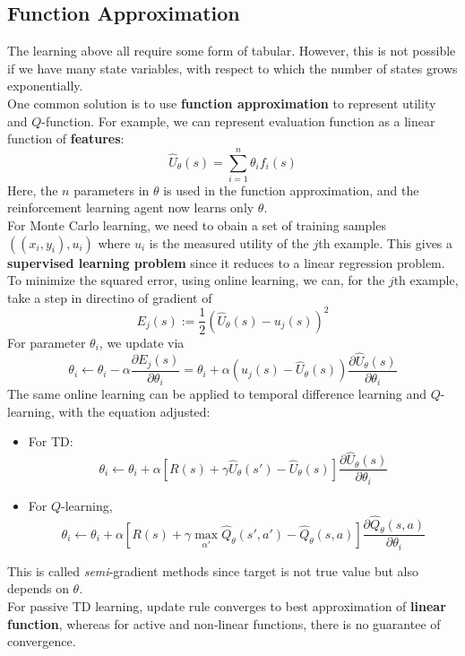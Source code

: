 \documentclass[12pt]{article}
\theoremstyle{definition}
\begin{document}
\subsection{Function Approximation}
The learning above all require some form of tabular. However, this is not possible if we have many state variables, with respect to which the number of states grows exponentially. \\
One common solution is to use \textbf{function approximation} to represent utility and $Q$-function. For example, we can represent evaluation function as a linear function of \textbf{features}:
\[
\hat{U}_{\theta}(s)=\sum_{i=1}^n \theta_if_i(s)
\]
Here, the $n$ parameters in $\theta$ is used in the function approximation, and the reinforcement learning agent now learns only $\theta$.\\
For Monte Carlo learning, we need to obain a set of training samples $((x_i,y_i), u_i)$ where $u_i$ is the measured utility of the $j$th example. This gives a \textbf{supervised learning problem} since it reduces to a linear regression problem.\\
To minimize the squared error, using online learning, we can, for the $j$th example, take a step in directino of gradient of
\[
E_j(s):=\frac{1}{2}(\hat{U}_\theta(s)-u_j(s))^2
\]
For parameter $\theta_i$, we update via
\[
\theta_i\leftarrow \theta_i-\alpha \frac{\partial E_j(s)}{\partial \theta_i}=\theta_i+\alpha(u_j(s)-\hat{U}_\theta(s))\frac{\partial \hat{U}_\theta(s)}{\partial \theta_i}
\]
The same online learning can be applied to temporal difference learning and $Q$-learning, with the equation adjusted:
\begin{itemize}
	\item For TD:
	\[
\theta_i\leftarrow \theta_i+\alpha[R(s)+\gamma\hat{U}_\theta(s')-\hat{U}_\theta(s)]\frac{\partial \hat{U}_\theta(s)}{\partial \theta_i}
	\]
	\item For $Q$-learning,
	\[
\theta_i\leftarrow \theta_i+\alpha[R(s)+\gamma\max_{\alpha'}\hat{Q}_\theta(s',a')-\hat{Q}_\theta(s,a)]\frac{\partial \hat{Q}_\theta(s,a)}{\partial \theta_i}
	\]
\end{itemize}
This is called \textit{semi}-gradient methods since target is not true value but also depends on $\theta$.\\
For passive TD learning, update rule converges to best approximation of \textbf{linear function}, whereas for active and non-linear functions, there is no guarantee of convergence.
\end{document}
